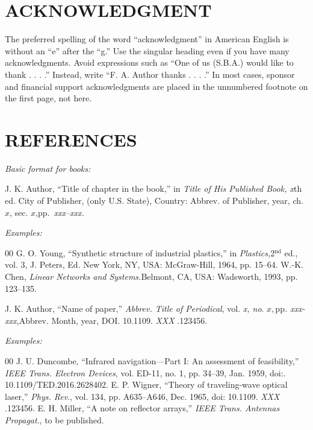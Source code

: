\documentclass{ieeetj}
\begin{document}
\section*{ACKNOWLEDGMENT}
The preferred spelling of the word ``acknowledgment'' in
American English is without an ``e'' after the ``g.'' Use the
singular heading even if you have many acknowledgments.
Avoid expressions such as ``One of us (S.B.A.) would like
to thank . . . .'' Instead, write ``F. A. Author thanks . . . .'' In
most cases, sponsor and financial support acknowledgments
are placed in the unnumbered footnote on the first page, not
here.

\section*{REFERENCES}

\def\refname{\vadjust{\vspace*{-2.5em}}} %

\noindent\textit{Basic format for books:}

\noindent J. K. Author, ``Title of chapter in the book,'' in {\it Title of His Published Book, x}th ed. City of Publisher,
(only U.S. State), Country: Abbrev. of Publisher, year, ch. $x$, sec. $x$,\break pp.~{\it xxx--xxx.}

{\it Examples:}

\begin{thebibliography}{00}
 G. O. Young, ``Synthetic structure of industrial plastics,'' in {\it Plastics,}2$^{\mathrm{nd}}$ ed., vol. 3, J. Peters, Ed. New York, NY, USA: McGraw-Hill, 1964, pp. 15--64.
 W.-K. Chen, {\it Linear Networks and Systems.}Belmont, CA, USA: Wadsworth, 1993, pp. 123--135.
\end{thebibliography}


\noindent J. K. Author, ``Name of paper,'' {\it Abbrev. Title of Periodical}, vol. {\it x, no}. $x, $pp{\it . xxx-xxx,}Abbrev. Month, year, DOI.
 {10.1109.} {{\it XXX}} {.123456}.

{\it Examples:}

\begin{thebibliography}{00}
 J. U. Duncombe, ``Infrared navigation---Part I: An assessment of feasibility,'' {\it IEEE Trans. Electron Devices}, vol. ED-11, no. 1, pp. 34--39, Jan. 1959, doi:.  {10.1109/TED.2016.2628402}.
 E. P. Wigner, ``Theory of traveling-wave optical laser,''
{\it Phys. Rev}., vol. 134, pp. A635--A646, Dec. 1965, doi:  {10.1109.} {{\it XXX}} {.123456}.
 E. H. Miller, ``A note on reflector arrays,'' {\it IEEE Trans. Antennas Propagat}., to be published.
\end{thebibliography}
\end{document}
